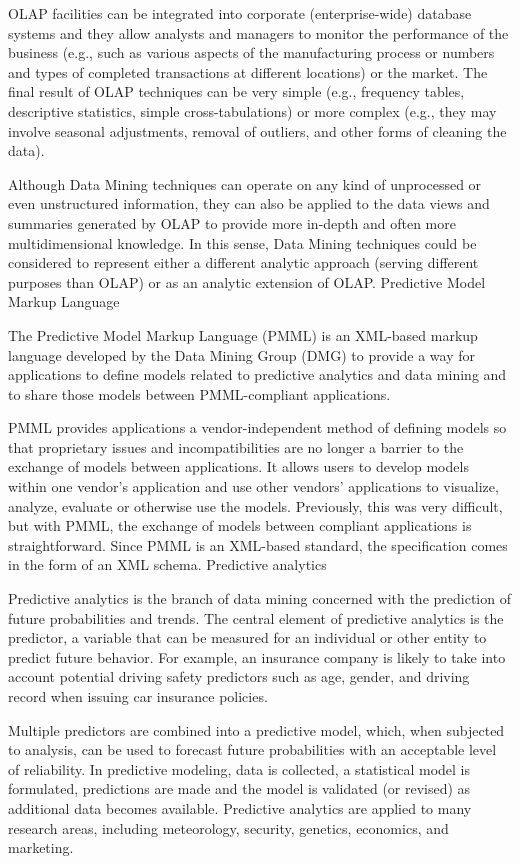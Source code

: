 OLAP facilities can be integrated into corporate (enterprise-wide) database systems and they allow analysts and managers to monitor the performance of the business (e.g., such as various aspects of the manufacturing process or numbers and types of completed transactions at different locations) or the market. The final result of OLAP techniques can be very simple (e.g., frequency tables, descriptive statistics, simple cross-tabulations) or more complex (e.g., they may involve seasonal adjustments, removal of outliers, and other forms of cleaning the data). 

Although Data Mining techniques can operate on any kind of unprocessed or even unstructured information, they can also be applied to the data views and summaries generated by OLAP to provide more in-depth and often more multidimensional knowledge. In this sense, Data Mining techniques could be considered to represent either a different analytic approach (serving different purposes than OLAP) or as an analytic extension of OLAP.
Predictive Model Markup Language 

The Predictive Model Markup Language (PMML) is an XML-based markup language developed by the Data Mining Group (DMG) to provide a way for applications to define models related to predictive analytics and data mining and to share those models between PMML-compliant applications.

PMML provides applications a vendor-independent method of defining models so that proprietary issues and incompatibilities are no longer a barrier to the exchange of models between applications. It allows users to develop models within one vendor's application and use other vendors' applications to visualize, analyze, evaluate or otherwise use the models. Previously, this was very difficult, but with PMML, the exchange of models between compliant applications is straightforward.
Since PMML is an XML-based standard, the specification comes in the form of an XML schema.
Predictive analytics 

Predictive analytics is the branch of data mining concerned with the prediction of future probabilities and trends. The central element of predictive analytics is the predictor, a variable that can be measured for an individual or other entity to predict future behavior. For example, an insurance company is likely to take into account potential driving safety predictors such as age, gender, and driving record when issuing car insurance policies.

Multiple predictors are combined into a predictive model, which, when subjected to analysis, can be used to forecast future probabilities with an acceptable level of reliability. In predictive modeling, data is collected, a statistical model is formulated, predictions are made and the model is validated (or revised) as additional data becomes available. Predictive analytics are applied to many research areas, including meteorology, security, genetics, economics, and marketing.

